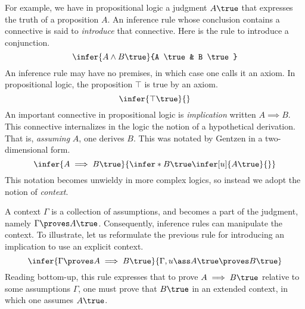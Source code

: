 For example, we have in propositional logic a judgment
$A \true$ that expresses the truth of a proposition $A$.
An inference rule whose conclusion contains a connective is said to
\emph{introduce} that connective. Here is the rule to introduce a conjunction.
\[
  \infer{%
    A \land B \true
  }{%
    A \true
    &
    B \true
  }
\]
%
An inference rule may have no premises, in which case one calls it an
axiom.
In propositional logic, the proposition $\top$ is true by an axiom.
%
\[
  \infer{\top\true}{}
\]
%
An important connective in propositional logic is \emph{implication} written
$A \implies B$.
This connective internalizes in the logic the notion of a hypothetical
derivation.
That is, \emph{assuming} $A$, one derives $B$.
This was notated by Gentzen in a two-dimensional form.
%
\[
  \infer{%
    A \implies B \true
  }{
    \infer*{%
      B \true
    }{
      \infer[u]{%
        A \true
      }{}
    }
  }
\]
%
This notation becomes unwieldy in more complex logics, so instead we adopt the
notion of \emph{context}.

A context $\Gamma$ is a collection of assumptions, and becomes a part of the
judgment, namely $\Gamma \proves A \true$.
Consequently, inference rules can manipulate the context.
To illustrate, let us reformulate the previous rule for introducing an
implication to use an explicit context.
%
\[
  \infer{%
    \Gamma \proves A \implies B \true
  }{
    \Gamma, u \ass A \true \proves B \true
  }
\]
%
Reading bottom-up, this rule expresses that to prove $A \implies B \true$
relative to some assumptions $\Gamma$, one must prove that $B \true$ in an
extended context, in which one assumes $A \true$.


